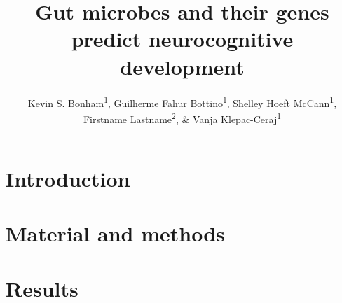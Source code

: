 \documentclass[a4paper]{article}
\title{Gut microbes and their genes predict neurocognitive development}
\author{Kevin S. Bonham\textsuperscript{1}, \space
Guilherme Fahur Bottino\textsuperscript{1}, \space
Shelley Hoeft McCann\textsuperscript{1}, \space
Firstname Lastname\textsuperscript{2}, \&
Vanja Klepac-Ceraj\textsuperscript{1}
}
\begin{document}
\begin{abstract}

\end{abstract}


\section*{Introduction}



\section*{Material and methods}



\section*{Results}


\end{document}
